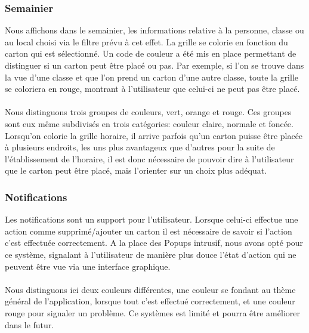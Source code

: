 \subsubsection{Semainier}
Nous affichons dans le semainier, les informations relative à la personne, classe ou au local choisi via le filtre prévu à cet effet. La grille se colorie en fonction du carton qui est sélectionné. Un code de couleur a été mis en place permettant de distinguer si un carton peut être placé ou pas. Par exemple, si l'on se trouve dans la vue d'une classe et que l'on prend un carton d'une autre classe, toute la grille se coloriera en rouge, montrant à l'utilisateur que celui-ci ne peut pas être placé.\\
\\
Nous distinguons trois groupes de couleurs, vert, orange et rouge. Ces groupes sont eux même subdivisés en trois catégories: couleur claire, normale et foncée. Lorsqu'on colorie la grille horaire, il arrive parfois qu'un carton puisse être placée à plusieurs endroits, les uns plus avantageux que d'autres pour la suite de l'établissement de l'horaire, il est donc nécessaire de pouvoir dire à l'utilisateur que le carton peut être placé, mais l'orienter sur un choix plus adéquat.
\subsubsection{Notifications}
Les notifications sont un support pour l'utilisateur. Lorsque celui-ci effectue une action comme supprimé/ajouter un carton il est nécessaire de savoir si l'action c'est effectuée correctement. A la place des Popups intrusif, nous avons opté pour ce système, signalant à l'utilisateur de manière plus douce l'état d'action qui ne peuvent être vue via une interface graphique.\\
\\
Nous distinguons ici deux couleurs différentes, une couleur se fondant au thème général de l'application, lorsque tout c'est effectué correctement, et une couleur rouge pour signaler un problème. Ce systèmes est limité et pourra être améliorer dans le futur.
